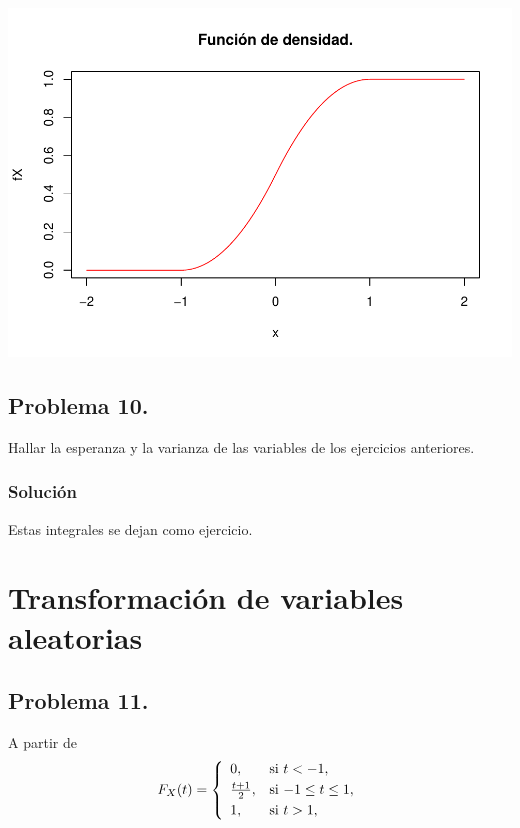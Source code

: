 \documentclass[
]{article}
\begin{document}
\includegraphics{Tema-2---Variables-Aleatorias_Soluciones_v1_0_files/figure-latex/unnamed-chunk-6-1.pdf}

\subsection{Problema 10.}\label{problema-10.}

Hallar la esperanza y la varianza de las variables de los ejercicios
anteriores.

\subsubsection{Solución}\label{soluciuxf3n-9}

Estas integrales se dejan como ejercicio.

\section{Transformación de variables
aleatorias}\label{transformaciuxf3n-de-variables-aleatorias}

\subsection{Problema 11.}\label{problema-11.}

A partir de \[
F_X(t)=
\left\{\begin{array}{ll}
0, & \mbox{si $t<-1$},
\\[0.1cm]
{t+1\over 2}, & \mbox{si $-1\leq t\leq
1$},
 \\[0.1cm]
1, & \mbox{si $t>1$},
\end{array}\right.
\]
\end{document}
